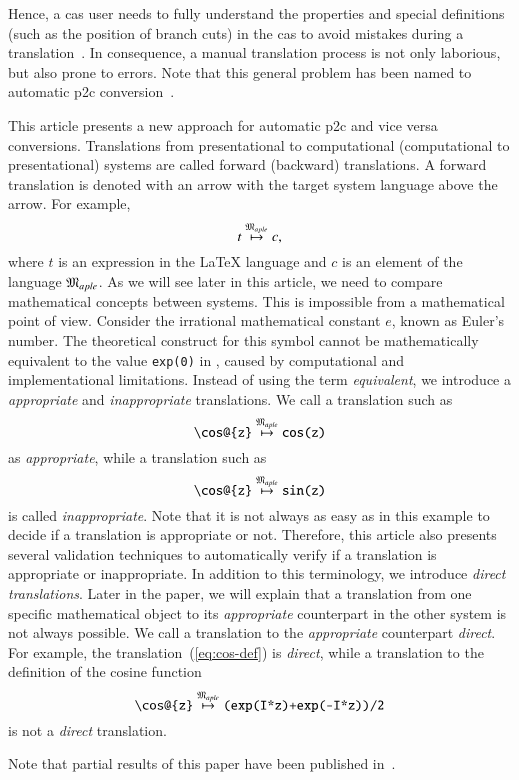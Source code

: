Hence, a \gls*{cas} user needs to fully understand the properties and special definitions (such as the position of branch cuts) in the \gls*{cas} to avoid mistakes during a translation~\parencite{Maple:Cuts}. In consequence, a manual translation process is not only laborious, but also prone to errors. Note that this general problem has been named to automatic \gls*{p2c} conversion~\parencite{POM-Tagger}.

This article presents a new approach for automatic \gls*{p2c} and vice versa conversions. Translations from presentational to computational (computational to presentational) systems are called forward (backward) translations. A forward translation is denoted with an arrow with the target system language above the arrow. For example,
\begin{equation*}
t \overset{\mathfrak{M}_{aple}}{\mapsto} c,
\end{equation*}
where $t$ is an expression in the \LaTeX{} language and $c$ is an element of the \Maple{} language $\mathfrak{M}_{aple}$. As we will see later in this article, we need to compare mathematical concepts between systems. This is impossible from a mathematical point of view. Consider the irrational mathematical constant $e$, known as Euler's number. The theoretical construct for this symbol cannot be mathematically equivalent to the value \verb|exp(0)| in \Maple, caused by computational and implementational limitations. Instead of using the term \textit{equivalent}, we introduce a \textit{appropriate} and \textit{inappropriate} translations. We call a translation such as
\begin{equation}\label{eq:cos-def}
\verb|\cos@{z}| \overset{\langMaple}{\mapsto} \verb|cos(z)|
\end{equation}
as \textit{appropriate}, while a translation such as
\begin{equation}
\verb|\cos@{z}| \overset{\langMaple}{\mapsto} \verb|sin(z)|
\end{equation}
is called \textit{inappropriate}. Note that it is not always as easy as in this example to decide if a translation is appropriate or not. Therefore, this article also presents several validation techniques to automatically verify if a translation is appropriate or inappropriate. In addition to this terminology, we introduce \textit{direct translations}. Later in the paper, we will explain that a translation from one specific mathematical object to its \textit{appropriate} counterpart in the other system is not always possible. We call a translation to the \textit{appropriate} counterpart \textit{direct}. For example, the translation~(\ref{eq:cos-def}) is \textit{direct}, while a translation to the definition of the cosine function
\begin{equation*}
\verb|\cos@{z}| \overset{\langMaple}{\mapsto} \verb|(exp(I*z)+exp(-I*z))/2|
\end{equation*}
is not a \textit{direct} translation.

Note that partial results of this paper have been published in~\parencite{CICM:Paper}.
